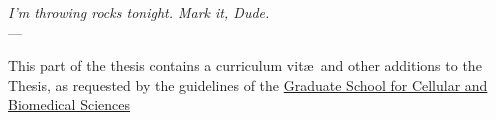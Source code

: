 \label{ch:cv}
\begin{flushright}{\slshape I'm throwing rocks tonight. Mark it, Dude.} \\ \medskip
    ---  \citep{TheBigLebowski}
\end{flushright}

This part of the thesis contains a curriculum vit\ae\ and other additions to the Thesis, as requested by the guidelines of the \href{http://www.gcb.unibe.ch/content/programme_description/phd_programme/phd_degree/index_eng.html}{Graduate School for Cellular and Biomedical Sciences}


